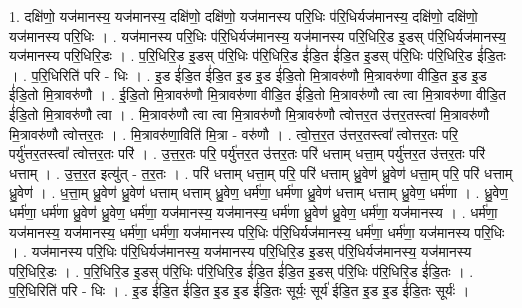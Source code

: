 \documentclass[17pt]{extarticle}
\begin{document}
1. दक्षि॑णो॒ यज॑मानस्य॒ यज॑मानस्य॒ दक्षि॑णो॒ दक्षि॑णो॒ यज॑मानस्य परि॒धिः प॑रि॒धिर्यज॑मानस्य॒ दक्षि॑णो॒ दक्षि॑णो॒ यज॑मानस्य परि॒धिः । . यज॑मानस्य परि॒धिः प॑रि॒धिर्यज॑मानस्य॒ यज॑मानस्य परि॒धिरि॒ड इ॒डस् प॑रि॒धिर्यज॑मानस्य॒ यज॑मानस्य परि॒धिरि॒डः । . प॒रि॒धिरि॒ड इ॒डस् प॑रि॒धिः प॑रि॒धिरि॒ड ई॑डि॒त ई॑डि॒त इ॒डस् प॑रि॒धिः प॑रि॒धिरि॒ड ई॑डि॒तः । . प॒रि॒धिरिति॑ परि - धिः । . इ॒ड ई॑डि॒त ई॑डि॒त इ॒ड इ॒ड ई॑डि॒तो मि॒त्रावरु॑णौ मि॒त्रावरु॑णा वीडि॒त इ॒ड इ॒ड ई॑डि॒तो मि॒त्रावरु॑णौ । . ई॒डि॒तो मि॒त्रावरु॑णौ मि॒त्रावरु॑णा वीडि॒त ई॑डि॒तो मि॒त्रावरु॑णौ त्वा त्वा मि॒त्रावरु॑णा वीडि॒त ई॑डि॒तो मि॒त्रावरु॑णौ त्वा । . मि॒त्रावरु॑णौ त्वा त्वा मि॒त्रावरु॑णौ मि॒त्रावरु॑णौ त्वोत्तर॒त उ॑त्तर॒तस्त्वा॑ मि॒त्रावरु॑णौ मि॒त्रावरु॑णौ त्वोत्तर॒तः । . मि॒त्रावरु॑णा॒विति॑ मि॒त्रा - वरु॑णौ । . त्वो॒त्त॒र॒त उ॑त्तर॒तस्त्वा᳚ त्वोत्तर॒तः परि॒ पर्यु॑त्तर॒तस्त्वा᳚ त्वोत्तर॒तः परि॑ । . उ॒त्त॒र॒तः परि॒ पर्यु॑त्तर॒त उ॑त्तर॒तः परि॑ धत्ताम् धत्ता॒म् पर्यु॑त्तर॒त उ॑त्तर॒तः परि॑ धत्ताम् । . उ॒त्त॒र॒त इत्यु॑त् - त॒र॒तः । . परि॑ धत्ताम् धत्ता॒म् परि॒ परि॑ धत्ताम् ध्रु॒वेण॑ ध्रु॒वेण॑ धत्ता॒म् परि॒ परि॑ धत्ताम् ध्रु॒वेण॑ । . ध॒त्ता॒म् ध्रु॒वेण॑ ध्रु॒वेण॑ धत्ताम् धत्ताम् ध्रु॒वेण॒ धर्म॑णा॒ धर्म॑णा ध्रु॒वेण॑ धत्ताम् धत्ताम् ध्रु॒वेण॒ धर्म॑णा । . ध्रु॒वेण॒ धर्म॑णा॒ धर्म॑णा ध्रु॒वेण॑ ध्रु॒वेण॒ धर्म॑णा॒ यज॑मानस्य॒ यज॑मानस्य॒ धर्म॑णा ध्रु॒वेण॑ ध्रु॒वेण॒ धर्म॑णा॒ यज॑मानस्य । . धर्म॑णा॒ यज॑मानस्य॒ यज॑मानस्य॒ धर्म॑णा॒ धर्म॑णा॒ यज॑मानस्य परि॒धिः प॑रि॒धिर्यज॑मानस्य॒ धर्म॑णा॒ धर्म॑णा॒ यज॑मानस्य परि॒धिः । . यज॑मानस्य परि॒धिः प॑रि॒धिर्यज॑मानस्य॒ यज॑मानस्य परि॒धिरि॒ड इ॒डस् प॑रि॒धिर्यज॑मानस्य॒ यज॑मानस्य परि॒धिरि॒डः । . प॒रि॒धिरि॒ड इ॒डस् प॑रि॒धिः प॑रि॒धिरि॒ड ई॑डि॒त ई॑डि॒त इ॒डस् प॑रि॒धिः प॑रि॒धिरि॒ड ई॑डि॒तः । . प॒रि॒धिरिति॑ परि - धिः । . इ॒ड ई॑डि॒त ई॑डि॒त इ॒ड इ॒ड ई॑डि॒तः सूर्यः॒ सूर्य॑ ईडि॒त इ॒ड इ॒ड ई॑डि॒तः सूर्यः॑ । \newline
\end{document}

